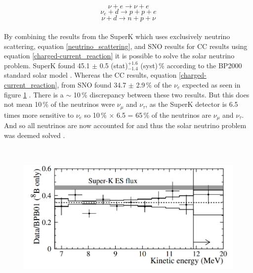 \documentclass[12pt,a4paper]{article}
\begin{document}
\begin{equation}
    \nu + e \rightarrow  \nu + e
    \label{neutrino_scattering}
\end{equation}
\begin{equation}
    \nu_e + d \rightarrow p + p + e 
    \label{charged-current_reaction}
\end{equation}
\begin{equation}
    \nu + d \rightarrow  n + p + \nu
    \label{neutral-current_reaction}
\end{equation}
\\By combining the results from the SuperK which uses exclusively neutrino scattering, equation \ref{neutrino_scattering}, and SNO results for CC results using equation \ref{charged-current_reaction} it is possible to solve the solar neutrino problem. SuperK found 45.1 $\pm$ 0.5 (stat)$^{+1.6}_{-1.4}$ (syst)\,\% according to the BP2000 standard solar model \cite{superK2001}. Whereas the CC results, equation \ref{charged-current_reaction}, from SNO found 34.7 $\pm$ 2.9\,\% of the $\nu_e$ expected as seen in figure \ref{sno_superK_comparision_plot} \cite{sno2001}. There is a $\sim$ 10\,\% discrepancy between these two results. But this does not mean 10\,\% of the neutrinos were $\nu_\mu$ and $\nu_\tau$, as the SuperK detector is 6.5 times more sensitive to $\nu_e$ so 10\,\% $\times$ 6.5 = 65\,\% of the neutrinos are $\nu_\mu$ and $\nu_\tau$. And so all neutrinos are now accounted for and thus the solar neutrino problem was deemed solved \cite{griffiths2008book} \cite{griffiths2008neutrinoOscillations}.


\begin{figure}
 \centering
 \includegraphics[height=75mm]{superKSnoComparison.png} %
 \label{sno_superK_comparision_plot}
\end{figure}
\end{document}
